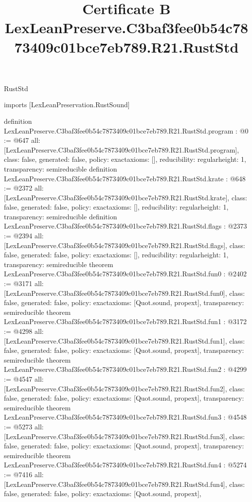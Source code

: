 \begin{lexlean}{RustStd}
\title{Certificate B LexLeanPreserve.C3baf3fee0b54c7873409c01bce7eb789.R21.RustStd}
\begin{coremodule}
imports [LexLeanPreservation.RustSound]

definition LexLeanPreserve.C3baf3fee0b54c7873409c01bce7eb789.R21.RustStd.program : @0 := @647 {
  all: [LexLeanPreserve.C3baf3fee0b54c7873409c01bce7eb789.R21.RustStd.program],
  class: false,
  generated: false,
  policy: exact{axioms: []},
  reducibility: regular{height: 1},
  transparency: semireducible
}
definition LexLeanPreserve.C3baf3fee0b54c7873409c01bce7eb789.R21.RustStd.krate : @648 := @2372 {
  all: [LexLeanPreserve.C3baf3fee0b54c7873409c01bce7eb789.R21.RustStd.krate],
  class: false,
  generated: false,
  policy: exact{axioms: []},
  reducibility: regular{height: 1},
  transparency: semireducible
}
definition LexLeanPreserve.C3baf3fee0b54c7873409c01bce7eb789.R21.RustStd.flags : @2373 := @2394 {
  all: [LexLeanPreserve.C3baf3fee0b54c7873409c01bce7eb789.R21.RustStd.flags],
  class: false,
  generated: false,
  policy: exact{axioms: []},
  reducibility: regular{height: 1},
  transparency: semireducible
}
theorem LexLeanPreserve.C3baf3fee0b54c7873409c01bce7eb789.R21.RustStd.fun0 : @2402 := @3171 {
  all: [LexLeanPreserve.C3baf3fee0b54c7873409c01bce7eb789.R21.RustStd.fun0],
  class: false,
  generated: false,
  policy: exact{axioms: [Quot.sound, propext]},
  transparency: semireducible
}
theorem LexLeanPreserve.C3baf3fee0b54c7873409c01bce7eb789.R21.RustStd.fun1 : @3172 := @4298 {
  all: [LexLeanPreserve.C3baf3fee0b54c7873409c01bce7eb789.R21.RustStd.fun1],
  class: false,
  generated: false,
  policy: exact{axioms: [Quot.sound, propext]},
  transparency: semireducible
}
theorem LexLeanPreserve.C3baf3fee0b54c7873409c01bce7eb789.R21.RustStd.fun2 : @4299 := @4547 {
  all: [LexLeanPreserve.C3baf3fee0b54c7873409c01bce7eb789.R21.RustStd.fun2],
  class: false,
  generated: false,
  policy: exact{axioms: [Quot.sound, propext]},
  transparency: semireducible
}
theorem LexLeanPreserve.C3baf3fee0b54c7873409c01bce7eb789.R21.RustStd.fun3 : @4548 := @5273 {
  all: [LexLeanPreserve.C3baf3fee0b54c7873409c01bce7eb789.R21.RustStd.fun3],
  class: false,
  generated: false,
  policy: exact{axioms: [Quot.sound, propext]},
  transparency: semireducible
}
theorem LexLeanPreserve.C3baf3fee0b54c7873409c01bce7eb789.R21.RustStd.fun4 : @5274 := @7416 {
  all: [LexLeanPreserve.C3baf3fee0b54c7873409c01bce7eb789.R21.RustStd.fun4],
  class: false,
  generated: false,
  policy: exact{axioms: [Quot.sound, propext]},
}
\end{coremodule}
\end{lexlean}

